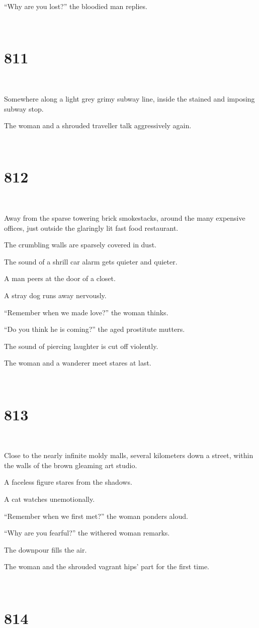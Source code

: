 \documentclass{report}
\begin{document}
``Why are you lost?'' the bloodied man replies.

~
\chapter*{811}
~

Somewhere along a light grey grimy subway line, inside the stained and imposing subway stop.

The woman and a shrouded traveller talk aggressively again.

~
\chapter*{812}
~

Away from the sparse towering brick smokestacks, around the many expensive offices, just outside the glaringly lit fast food restaurant.

The crumbling walls are sparsely covered in dust.

The sound of a shrill car alarm gets quieter and quieter.

A man peers at the door of a closet.

A stray dog runs away nervously.

``Remember when we made love?'' the woman thinks.

``Do you think he is coming?'' the aged prostitute mutters.

The sound of piercing laughter is cut off violently.

The woman and a wanderer meet stares at last.

~
\chapter*{813}
~

Close to the nearly infinite moldy malls, several kilometers down a street, within the walls of the brown gleaming art studio.

A faceless figure stares from the shadows.

A cat watches unemotionally.

``Remember when we first met?'' the woman ponders aloud.

``Why are you fearful?'' the withered woman remarks.

The downpour fills the air.

The woman and the shrouded vagrant hips' part for the first time.

~
\chapter*{814}
~
\end{document}
